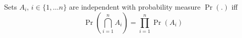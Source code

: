 Sets $A_i, \, i \in \{1, \dots n\}$ are independent with probability measure $\operatorname{Pr}(.)$ iff
$$\operatorname{Pr}(\bigcap\limits_{i=1}^n A_i) = \prod\limits_{i=1}^n \operatorname{Pr}(A_i)$$
